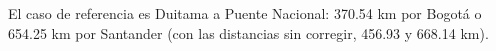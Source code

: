 El caso de referencia es Duitama a Puente Nacional: 370.54 km por Bogotá o 654.25 km por Santander (con las distancias sin corregir, 456.93 y 668.14 km).
